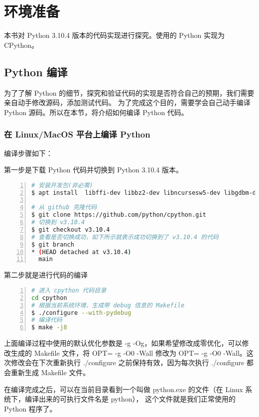 \chapter{环境准备}

本书对 Python 3.10.4 版本的代码实现进行探究。使用的 Python 实现为 CPython。

\section{Python 编译}

为了了解 Python 的细节，探究和验证代码的实现是否符合自己的预期，我们需要亲自动手修改源码，添加测试代码。
为了完成这个目的，需要学会自己动手编译 Python 源码。所以在本节，将介绍如何编译 Python 代码。

\subsection{在 Linux/MacOS 平台上编译 Python}

编译步骤如下：

第一步是下载 Python 代码并切换到 Python 3.10.4 版本。

\begin{lstlisting}[language=bash, numbers=left, numbersep=1em, numberstyle=\footnotesize , breaklines=true]
# 安装开发包(非必需)
$ apt install  libffi-dev libbz2-dev libncursesw5-dev libgdbm-dev liblzma-dev libsqlite3-dev tk-dev uuid-dev libreadline-dev

# 从 github 克隆代码
$ git clone https://github.com/python/cpython.git
# 切换到 v3.10.4
$ git checkout v3.10.4
# 查看是否切换成功，如下所示就表示成功切换到了 v3.10.4 的代码
$ git branch
* (HEAD detached at v3.10.4)
  main
\end{lstlisting}

第二步就是进行代码的编译

\begin{lstlisting}[language=bash, numbers=left, numbersep=1em, numberstyle=\footnotesize , breaklines=true]
# 进入 cpython 代码目录
cd cpython
# 根据当前系统环境，生成带 debug 信息的 Makefile 
$ ./configure --with-pydebug
# 编译代码
$ make -j8
\end{lstlisting}

上面编译过程中使用的默认优化参数是 -g -Og，如果希望修改成零优化，可以修改生成的 Makefile 文件，将 OPT= -g -O0 -Wall
修改为 OPT= -g -O0 -Wall。这次修改会在下次重新执行 ./configure 之前保持有效，因为每次执行 ./configure 都会重新生成
Makefile 文件。

在编译完成之后，可以在当前目录看到一个叫做 python.exe 的文件（在 Linux 系统下，编译出来的可执行文件名是 python），
这个文件就是我们正常使用的 Python 程序了。

